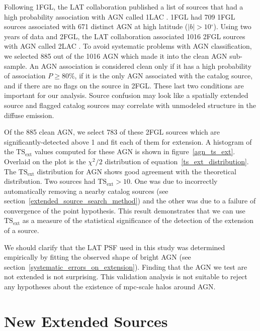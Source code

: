 \documentclass[12pt,preprint]{aastex}
\newcommand{\gev}{\text{GeV}\xspace}
\newcommand{\tsext}{{\ensuremath{\text{TS}_{\text{ext}}}}\xspace}
\renewcommand{\deg}{\ensuremath{^\circ}\xspace}
\begin{document}
Following 1FGL, the LAT collaboration published a list 
of sources that
had a high probability association with AGN 
called 1LAC \citep{first_agn_cat}.
1FGL had 709 1FGL sources associated with 671 distinct AGN at high
latitude ($|b|>10\deg$).  
Using two years of data and 2FGL, the LAT collaboration
associated 1016 2FGL sources
with AGN called 2LAC \citep{second_agn_cat}.
To avoid systematic problems with AGN classification, we
selected 885 out of the 1016 AGN which made it into the clean AGN sub-sample.  An AGN
association is considered clean only if it has a high probability
of association $P\ge 80\%$, if it is the only AGN associated with the
catalog source, and if there are no flags on the source in 2FGL. These
last two conditions are important for our analysis. Source
confusion may look like a spatially extended source and flagged catalog
sources may correlate with unmodeled structure in the diffuse emission.

Of the 885 clean AGN, we select 783 of these 2FGL sources which
are significantly-detected above 1 \gev and fit each of them for extension.
A histogram of the \tsext values computed for these AGN is
shown in figure~\ref{agn_ts_ext}. Overlaid on the plot is the
$\chi^2/2$ distribution of equation~\ref{ts_ext_distribution}.
The \tsext distribution for AGN shows good agreement with the
theoretical distribution.  Two sources had $\tsext>10$.  One was due
to incorrectly automatically removing a nearby catalog sources (see
section~\ref{extended_source_search_method}) and the other was due to a
failure of convergence of the point hypothesis.  This result demonstrates
that we can use \tsext as a measure of the statistical significance of
the detection of the extension of a source.

We should clarify that the LAT PSF used in this study was determined
empirically by fitting the observed shape of bright AGN (see
section~\ref{systematic_errors_on_extension}). Finding that the AGN we
test are not extended is not surprising.  This validation analysis is
not suitable to reject any hypotheses about the existence of mpc-scale
halos around AGN.

\section{New Extended Sources}
\label{new_ext_srcs_section}

\end{document}
